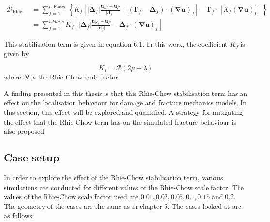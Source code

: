 \documentclass[sn-mathphys,Numbered,draft]{sn-jnl}%
\begin{document}
\begin{equation}
\begin{aligned}
\mathcal{D}_{\text {Rhie-Chow }} &=\sum_{f=1}^{n \text { Faces }}\left\{K_f\left[\left|\boldsymbol{\Delta}_f\right| \frac{\boldsymbol{u}_{N_f}-\boldsymbol{u}_P}{\left|\boldsymbol{d}_f\right|}+\left(\boldsymbol{\Gamma}_f-\boldsymbol{\Delta}_f\right) \cdot(\boldsymbol{\nabla} \boldsymbol{u})_f\right]-\boldsymbol{\Gamma}_f \cdot\left[K_f(\boldsymbol{\nabla} \boldsymbol{u})_f\right]\right\} \\
&=\sum_{f=1}^{n F a c e s} K_f\left[\left|\boldsymbol{\Delta}_f\right| \frac{\boldsymbol{u}_{N_f}-\boldsymbol{u}_P}{\left|\boldsymbol{d}_f\right|}-\boldsymbol{\Delta}_f \cdot(\boldsymbol{\nabla} \boldsymbol{u})_f\right]
\end{aligned}
\end{equation}


This stabilisation term is given in equation 6.1. In this work, the coefficient $K_f$ is given by

\begin{equation}
\label{eqn:scaleEquation}
K_f=\mathcal{R} \left(2 \mu+\lambda\right)
\end{equation}
where $\mathcal{R}$ is the Rhie-Chow scale factor.

A finding presented in this thesis is that this Rhie-Chow stabilisation term has an effect on the localisation behaviour for damage and fracture mechanics models. In this section, this effect will be explored and quantified. A strategy for mitigating the effect that the Rhie-Chow term has on the simulated fracture behaviour is also proposed.

\subsection{Case setup}
\label{rhieChowExplorationCases}

In order to explore the effect of the Rhie-Chow stabilisation term, various simulations are conducted for different values of the Rhie-Chow scale factor. The values of the Rhie-Chow scale factor used are $0.01,0.02,0.05,0.1,0.15$ and $0.2$. The geometry of the cases are the same as in chapter 5. The cases looked at are as follows:
\end{document}
